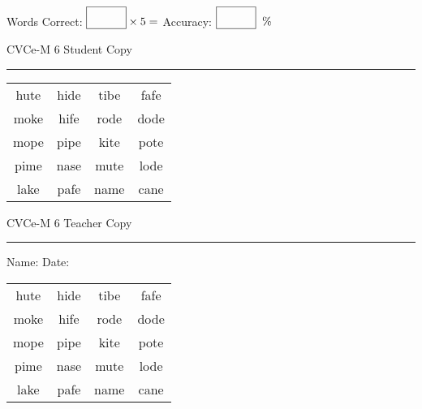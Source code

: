 \documentclass{memoir}
\begin{document}
\small

Words Correct: $\fbox{\phantom{\huge 100}} \times 5 = $ Accuracy: $\fbox{\phantom{\huge 100}}\;\; \%$ 

\vfill

\newpage


\footnotesize \noindent
CVCe-M 6 \hfill Student Copy
\smallskip
\hrule

\Large

\setlength{\tabcolsep}{14pt}
\def\arraystretch{2}

{\selectfont


\begin{vplace}[0.5]
\begin{center}
\begin{tabular}{cccc}
hute & hide & tibe & fafe \\
moke & hife & rode & dode \\
mope & pipe & kite & pote \\
pime & nase & mute & lode \\
lake & pafe & name & cane \\
\end{tabular}
\end{center}
\end{vplace}

}

\newpage

\footnotesize \noindent
CVCe-M 6 \hfill Teacher Copy
\smallskip
\hrule

\small

\vfill

\noindent
Name: \underline{\hspace{1.75in}} \hfill Date: \underline{\hspace{1in}}

\Large

{\selectfont


\begin{vplace}[0.5]
\begin{center}
\begin{tabular}{cccc}
hute & hide & tibe & fafe \\
moke & hife & rode & dode \\
mope & pipe & kite & pote \\
pime & nase & mute & lode \\
lake & pafe & name & cane \\
\end{tabular}
\end{center}
\end{vplace}



}
\end{document}
